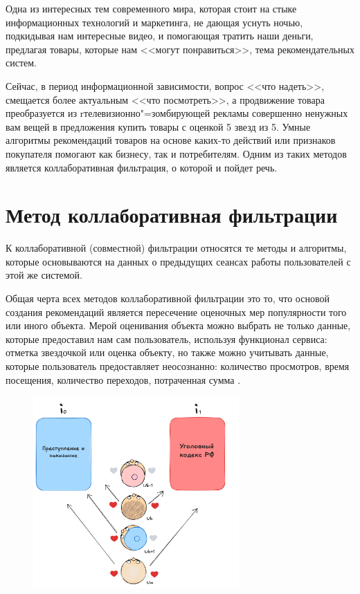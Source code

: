 \documentclass[referat]{SCWorks}
\begin{document}
\tableofcontents

\intro

Одна из интересных тем современного мира, которая стоит на стыке информационных технологий и маркетинга,
не дающая уснуть ночью, подкидывая нам интересные видео, и помогающая тратить наши деньги, предлагая товары,
которые нам <<могут понравиться>>, тема рекомендательных систем. 

Сейчас, в период информационной зависимости, вопрос 
<<что надеть>>, смещается более актуальным <<что посмотреть>>, а продвижение товара преобразуется из rтелевизионно"=зомбирующей рекламы совершенно ненужных вам вещей в предложения купить товары с оценкой 5 звезд 
из 5. Умные алгоритмы рекомендаций товаров на основе каких-то действий или признаков покупателя помогают как бизнесу, 
так и потребителям. Одним из таких методов является коллаборативная фильтрация, о которой и пойдет речь. 


\section{Метод коллаборативная фильтрации}
К коллаборативной (совместной) фильтрации относятся те методы и
алгоритмы, которые основываются на данных о предыдущих сеансах работы пользователей с этой же
системой. 

Общая черта всех методов коллаборативной фильтрации это то, что основой создания
рекомендаций является пересечение оценочных мер популярности того или иного объекта.
Мерой оценивания объекта можно выбрать не только данные, которые предоставил нам сам пользователь, используя функционал сервиса: отметка звездочкой или оценка объекту,
но также можно учитывать данные, которые пользователь предоставляет неосознанно: 
количество просмотров, время посещения, количество переходов, потраченная сумма \cite{smolenchuk}.

\begin{figure}[H]
  \centering
  \includegraphics[width=0.7\textwidth]{./2.png}
  \caption{}
\end{figure}
\end{document}
